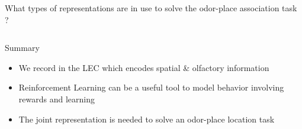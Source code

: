 \documentclass[bigger]{beamer}
\begin{document}
\begin{frame}[label={sec:org4b07cd7}]{What types of representations are in use to solve the odor-place association task ?}
\begin{columns}
\begin{column}[t]{0.5\columnwidth}
\end{column}
\end{columns}
\end{frame}

\begin{frame}[<+->][label={sec:org0901433}]{Summary}
\begin{itemize}
\item We record in the LEC which encodes spatial \& olfactory information
\item Reinforcement Learning can be a useful tool to model behavior involving rewards and learning
\item The joint representation is needed to solve an odor-place location task
\end{itemize}
\end{frame}
\end{document}
